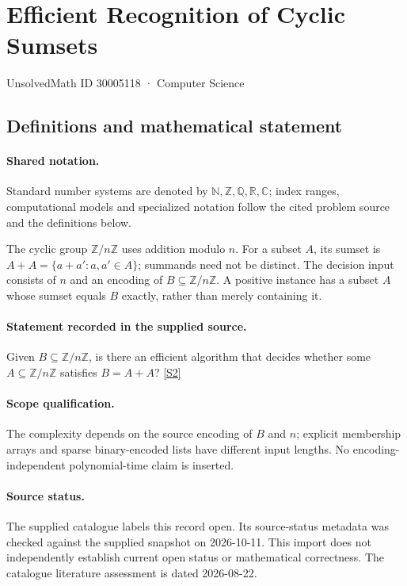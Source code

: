 \documentclass[11pt]{article}
\newcommand{\sref}[2]{\hyperlink{source:#1:#2}{[S#2]}}
\begin{document}
\setcounter{section}{30005117}
\section{Efficient Recognition of Cyclic Sumsets}\label{30005118}
{\small\sffamily UnsolvedMath ID 30005118 · Computer Science}
\subsection{Definitions and mathematical statement}

\paragraph{Shared notation.}Standard number systems are denoted by $\mathbb N,\mathbb Z,\mathbb Q,\mathbb R,\mathbb C$; index ranges, computational models and specialized notation follow the cited problem source and the definitions below.


The cyclic group $\mathbb Z/n\mathbb Z$ uses addition modulo $n$. For a subset $A$, its sumset is $A+A=\{a+a':a,a'\in A\}$; summands need not be distinct. The decision input consists of $n$ and an encoding of $B\subseteq\mathbb Z/n\mathbb Z$. A positive instance has a subset $A$ whose sumset equals $B$ exactly, rather than merely containing it.
\paragraph{Statement recorded in the supplied source.}
Given $B\subseteq\mathbb Z/n\mathbb Z$, is there an efficient algorithm that decides whether some $A\subseteq\mathbb Z/n\mathbb Z$ satisfies $B=A+A$? \sref{30005118}{2}
\paragraph{Scope qualification.}
The complexity depends on the source encoding of $B$ and $n$; explicit membership arrays and sparse binary-encoded lists have different input lengths. No encoding-independent polynomial-time claim is inserted.
\paragraph{Source status.}
The supplied catalogue labels this record open. Its source-status metadata was checked against the supplied snapshot on 2026-10-11. This import does not independently establish current open status or mathematical correctness. The catalogue literature assessment is dated 2026-08-22.
\end{document}
